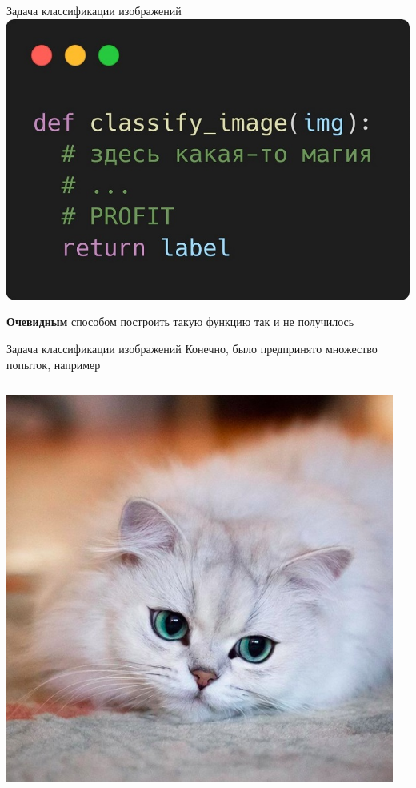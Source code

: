 \documentclass[aspectratio=169]{beamer}
\begin{document}
\begin{frame}{Задача классификации изображений}
    \centering
    \includegraphics[width=.5\linewidth]{graphs/fig6_1.jpg}

    \textbf{Очевидным} способом построить такую функцию так и не получилось
\end{frame}

\begin{frame}{Задача классификации изображений}
    Конечно, было предпринято множество попыток, например
    \vfill
    \begin{columns}
        \begin{column}{.25\linewidth}
            \includegraphics[width=\linewidth]{graphs/fig5.jpg}
        \end{column}
        \pause{}
        \begin{column}{.15\linewidth}
            \centering

\end{column}
\end{columns}
\end{frame}
\end{document}
